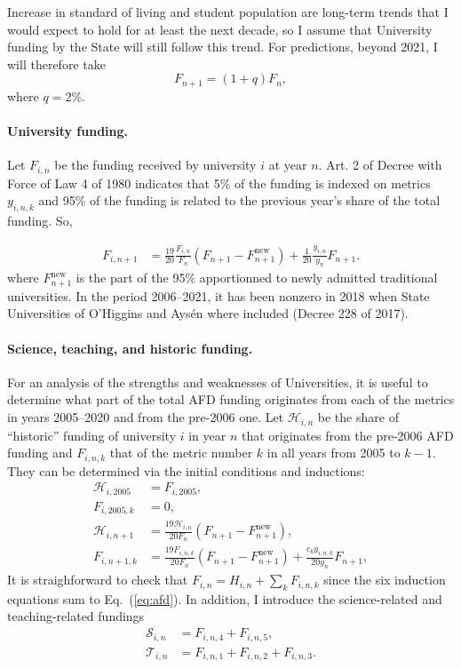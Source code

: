 \documentclass[twocolumn]{article}
\begin{document}
Increase in standard of living and student population are long-term trends that I would expect to hold for at least the next decade, so I assume that University funding by the State will still follow this trend. For predictions, beyond 2021, I will therefore take
\begin{equation}
    F_{n+1} = (1+q) F_n, \label{eq:F}
\end{equation}
where $q = 2$\%.

\paragraph{University funding.}
Let $F_{i,n}$ be the funding received by university $i$ at year $n$. Art. 2 of
Decree with Force of Law 4 of 1980 indicates that 5\% of the funding is indexed
on metrics $y_{i,n,k}$ and 95\% of the funding is related to the previous year's
share of the total funding.  So,

\begin{align}
    F_{i,n+1} &= \frac{19}{20} \frac{F_{i,n}}{F_{n}} (F_{n+1} - F_{n+1}^\text{new})
               + \frac 1{20} \frac{y_{i,n}}{y_n} F_{n+1}.
        \label{eq:afd}
\end{align}
where $F_{n+1}^\text{new}$ is the part of the 95\% apportionned to newly admitted traditional universities.  In the period 2006--2021, it has been nonzero in 2018 when State Universities of O'Higgins and Aysén where included (Decree 228 of 2017).  

\paragraph{Science, teaching, and historic funding.}  For an analysis of the strengths and weaknesses of Universities, it is useful to determine what part of the total AFD funding originates from each of the metrics in years 2005--2020 and from the pre-2006 one.  Let $\mathcal{H}_{i,n}$ be the share of ``historic'' funding of university $i$ in year $n$ that originates from the pre-2006 AFD funding and $F_{i,n,k}$ that of the metric number $k$ in all years from 2005 to $k-1$. They can be determined via the initial conditions and inductions:
\begin{align}
  \mathcal{H}_{i,2005}    &= F_{i,2005},\\
  F_{i,2005,k}  &= 0,\\
  \mathcal{H}_{i,n + 1}   &= \frac{19\mathcal{H}_{i,n}}{20F_n} 
                              \left( F_{n+1} - F_{n+1}^\text{new} \right),\\
  F_{i,n + 1,k} &= \frac{19 F_{i,n,k} }{20F_n}
                              \left( F_{n+1} - F_{n+1}^\text{new} \right)
                  + \frac{c_k y_{i,n,k}}{20y_n} F_{n+1},
\end{align}
It is straighforward to check that $F_{i,n} = H_{i,n} + \sum_k F_{i,n,k}$ since the six induction equations sum to Eq.~(\ref{eq:afd}). In addition, I introduce the science-related and teaching-related fundings
\begin{align}
    \mathcal{S}_{i,n} &= F_{i,n,4} + F_{i,n,5},\\
    \mathcal{T}_{i,n} &= F_{i,n,1} + F_{i,n,2} + F_{i,n,3}.
\end{align} 
\end{document}
